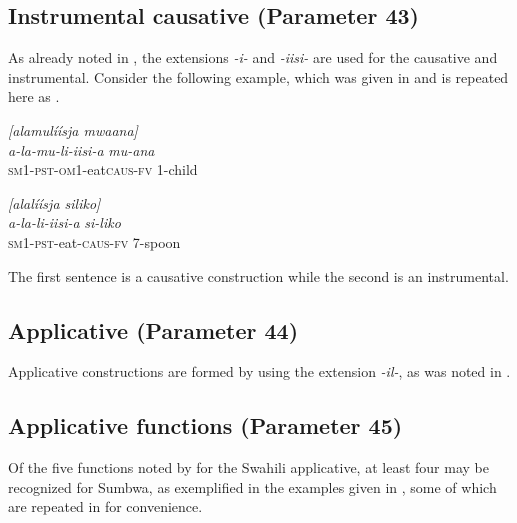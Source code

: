 \documentclass[output=paper		  ]{langscibook}
\begin{document}
\subsection{Instrumental causative (Parameter 43)}\label{sec:kahigi:4.8}

{As already noted in , the extensions} {\textit{{}-i-} }{and}{ \textit{-iisi-}} {are used for the causative and instrumental. Consider the following example, which was given in  and is repeated here as .}

\ea\label{ex:kahigi:59}
    \ea\label{ex:kahigi:59a} \textit{[alamulíísja mwaana]}\\
 \gll \textit{a-la-mu-li-iisi-a}                \textit{mu-ana}\\
 \textsc{sm1-pst-om1-}eat\textsc{caus-fv}  1-child\\

    \ex\label{ex:kahigi:59b} \textit{[alalíísja siliko]}\\
 \gll \textit{a-la-li-iisi-a}                \textit{si-liko}\\
 \textsc{sm1-pst-}eat-\textsc{caus-fv}   7-spoon\\
    \z
\z

{The first sentence is a causative construction while the second is an instrumental.}

\subsection{Applicative (Parameter 44)}\label{sec:kahigi:4.9}

{Applicative constructions are formed by using the extension} {\textit{{}-il-}}{, as was noted in .}

\subsection{Applicative functions (Parameter 45)}\label{sec:kahigi:4.10}

{Of the five functions noted by \citet[218--221]{Ashton1947} for the Swahili applicative, at least four may be recognized for Sumbwa, as exemplified in the examples given in , some of which are repeated in  for convenience.}
\end{document}
